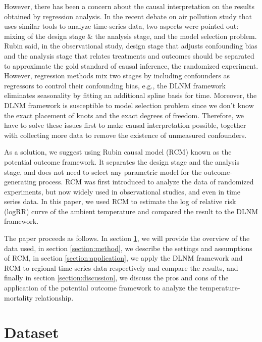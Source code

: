 \documentclass[12pt]{article}
\begin{document}
However, there has been a concern about the causal interpretation 
on the results obtained by regression analysis.
In the recent debate on air pollution study\cite{dominici2019sci} 
that uses similar tools to analyze time-series data,
two aspects were pointed out:
mixing of the design stage \& the analysis stage, and the model selection problem.
Rubin said, in the observational study,
design stage that adjusts confounding bias and the analysis stage that relates treatments and outcomes
should be separated to approximate the gold standard of causal inference, 
the randomized experiment\cite{rubin2007sim}.
However, regression methods mix two stages
by including confounders as regressors to control their confounding bias,
e.g., the DLNM framework eliminates seasonality by fitting an additional spline basis for time.
Moreover, the DLNM framework is susceptible to model selection problem\cite{gasparrini2016}
since we don't know the exact placement of knots and the exact degrees of freedom.
Therefore, we have to solve these issues first to make causal interpretation possible,
together with collecting more data to remove the existence of unmeasured confounders.

As a solution, we suggest using Rubin causal model (RCM)\cite{holland1986}
known as the potential outcome framework.
It separates the design stage and the analysis stage,
and does not need to select any parametric model for the outcome-generating process.
RCM was first introduced 
to analyze the data of randomized experiments\cite{rubin1974},
but now widely used in observational studies\cite{wu2020sciadv},
and even in time series data\cite{angrist2018}.
In this paper, 
we used RCM to estimate the log of relative risk (logRR) curve of the ambient temperature 
and compared the result to the DLNM framework.

The paper proceeds as follows.
In section \ref{section:data}, we will provide the overview of the data used,
in section \ref{section:method}, we describe the settings and assumptions of RCM,
in section \ref{section:application}, 
we apply the DLNM framework and RCM
to regional time-series data respectively and compare the results,
and finally in section \ref{section:discussion},
we discuss the pros and cons of the application of the potential outcome framework 
to analyze the temperature-mortality relationship.



\section{Dataset}
\label{section:data}
\end{document}
